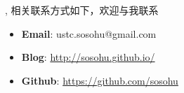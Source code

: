 
\begin{flushleft}
, 相关联系方式如下，欢迎与我联系
\begin{itemize}
\item{\textbf{Email}}:	ustc.sosohu@gmail.com
\item{\textbf{Blog}}:	\href{http://sosohu.github.io/}{http://sosohu.github.io/}
\item{\textbf{Github}}:	\href{https://github.com/sosohu}{https://github.com/sosohu}
\end{itemize}
\end{flushleft}
